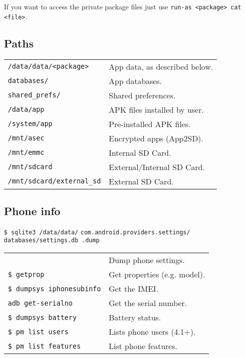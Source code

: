 \documentclass[11pt,landscape,a4paper]{article}
\begin{document}
\begin{multicols}{3}
\vspace*{2mm}

If you want to access the private package files just use \verb!run-as <package> cat <file>!.

\subsection{Paths}
\begin{tabular}{@{}ll@{}}
\texttt{/data/data/<package>} & App data, as described below.\\
\hspace*{4mm} \texttt{databases/} & App databases.\\
\hspace*{4mm} \texttt{shared\_prefs/} & Shared preferences.\\
\texttt{/data/app} & APK files installed by user.\\
\texttt{/system/app} & Pre-installed APK files.\\
\texttt{/mnt/asec} & Encrypted apps (App2SD).\\
\texttt{/mnt/emmc} & Internal SD Card.\\
\texttt{/mnt/sdcard} & External/Internal SD Card.\\
\texttt{/mnt/sdcard/external\_sd} & External SD Card.\\
\end{tabular}

\parbox{0.25\textwidth}{
\subsection{Phone info}
\texttt{\$ sqlite3 /data/data/}
\hspace*{1.7cm}\texttt{com.android.providers.settings/}
\hspace*{1.7cm}\texttt{databases/settings.db  .dump}
\begin{tabular}{@{}ll@{}}
\texttt{} & Dump phone settings. \\
\texttt{\$ getprop} & Get properties (e.g. model). \\
\texttt{\$ dumpsys iphonesubinfo} & Get the IMEI.\\
\texttt{adb get-serialno} & Get the serial number.\\
\texttt{\$ dumpsys battery} & Battery status.\\
\texttt{\$ pm list users}  &  Lists phone users (4.1+). \\
\texttt{\$ pm list features}  &  List phone features.\\
\end{tabular}}
\parbox{0.33\textwidth}{
}
\end{multicols}
\end{document}
